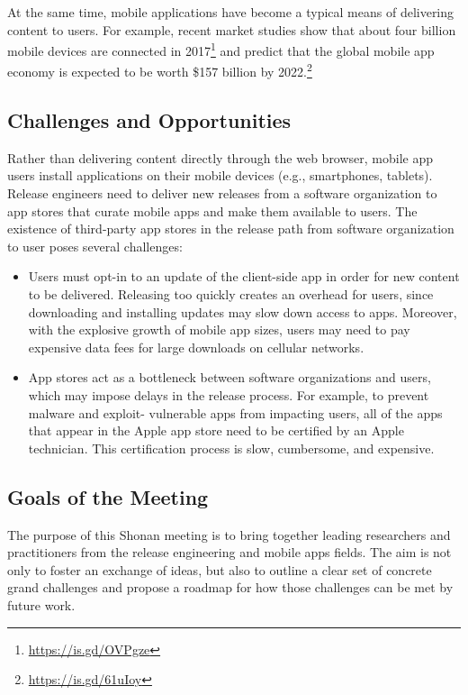 \documentclass[a4paper]{article}
\begin{document}
At the same time, mobile applications have become a typical means of delivering content to users. For example, recent market studies show that about four billion mobile devices are connected in 2017\footnote{\url{https://is.gd/OVPgze}} and predict that the global mobile app economy is expected to be worth \$157 billion by 2022.\footnote{\url{https://is.gd/61uIoy}}

\subsection{Challenges and Opportunities}

Rather than delivering content directly through the web browser, mobile app users install applications on their mobile devices (e.g., smartphones, tablets).
Release engineers need to deliver new releases from a software organization to app stores that curate mobile apps and make them available to users.
The existence of third-party app stores in the release path from software organization to user poses several challenges:

\begin{itemize}
\item Users must opt-in to an update of the client-side app in order for new content to be delivered. Releasing too quickly creates an overhead for users, since downloading and installing updates may slow down access to apps. Moreover, with the explosive growth of mobile app sizes, users may need to pay expensive data fees for large downloads on cellular networks.
\item App stores act as a bottleneck between software organizations and users, which may impose delays in the release process. For example, to prevent malware and exploit- vulnerable apps from impacting users, all of the apps that appear in the Apple app store need to be certified by an Apple technician. This certification process is slow, cumbersome, and expensive.
\end{itemize}

\subsection{Goals of the Meeting}

The purpose of this Shonan meeting is to bring together leading researchers and practitioners from the release engineering and mobile apps fields. The aim is not only to foster an exchange of ideas, but also to outline a clear set of concrete grand challenges and propose a roadmap for how those challenges can be met by future work.
\end{document}
